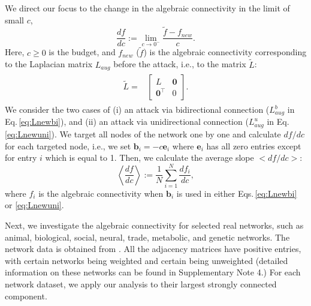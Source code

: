 \documentclass[%
 reprint,
 amsmath,amssymb,
 aip,
]{revtex4-2}
\def \bb {\pmb{b}}
\theoremstyle{italichead}
\theoremstyle{definition}
\begin{document}
{We direct our focus to the change in the algebraic connectivity in the limit of small $c$,
\begin{equation}
    \frac{d f}{d c} := \lim_{c \to 0^-} \dfrac{\tilde{f} - f_{new}}{c}.
\end{equation}
Here, $c \geq 0$ is the budget, and $f_{new}$ ($\tilde{f}$) is the algebraic connectivity corresponding to the Laplacian matrix $L_{aug}$ before the attack, i.e., to the matrix $\tilde{L}$:
\begin{align}
\begin{split}
    \tilde{L} = &
    \begin{bmatrix}
    L & \pmb{0} \\ 
    \pmb{0}^\top &  0
    \end{bmatrix}.
\end{split}
\end{align}
We consider the two cases of (i) an attack via bidirectional connection ($L_{aug}^b$ in Eq.\,\eqref{eq:Lnewbi}), and (ii) an attack via unidirectional connection ($L_{aug}^u$ in Eq.\,\eqref{eq:Lnewuni}).
We target all nodes of the network one by one and calculate $d f / d c$ for each targeted node, i.e., we set $\bb_i = -c \pmb{e}_i$ where $\pmb{e}_i$ has all zero entries except for entry $i$ which is equal to 1.
Then, we calculate 
the average slope $< df / d c >$:
\begin{equation}
    \left< \frac{d f}{d c} \right> := \dfrac{1}{N} \sum_{i=1}^N \frac{d f_i}{d c},
\end{equation}
where $f_i$ is the algebraic connectivity when $\bb_i$ is used in either Eqs.\,\eqref{eq:Lnewbi} or \eqref{eq:Lnewuni}.


Next, we investigate the algebraic connectivity for selected real networks,
 such as animal, biological, social, neural, trade, metabolic, and genetic networks.
The network data is obtained from \cite{konect}. {All the adjacency matrices have positive entries, with certain networks being weighted and certain being unweighted (detailed information on these networks can be found in Supplementary Note 4.)} 
For each network dataset, we apply our analysis to their largest strongly connected component. %

}
\end{document}
